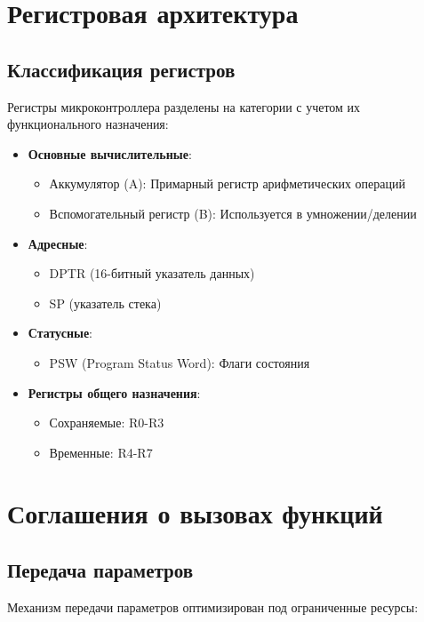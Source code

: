 \documentclass{article}
\begin{document}
\section{Регистровая архитектура}
\subsection{Классификация регистров}
Регистры микроконтроллера разделены на категории с учетом их функционального назначения:

\begin{itemize}
    \item \textbf{Основные вычислительные}:
        \begin{itemize}
            \item Аккумулятор (A): Примарный регистр арифметических операций
            \item Вспомогательный регистр (B): Используется в умножении/делении
        \end{itemize}
    
    \item \textbf{Адресные}:
        \begin{itemize}
            \item DPTR (16-битный указатель данных)
            \item SP (указатель стека)
        \end{itemize}
    
    \item \textbf{Статусные}:
        \begin{itemize}
            \item PSW (Program Status Word): Флаги состояния
        \end{itemize}
    
    \item \textbf{Регистры общего назначения}:
        \begin{itemize}
            \item Сохраняемые: R0-R3
            \item Временные: R4-R7
        \end{itemize}
\end{itemize}

\section{Соглашения о вызовах функций}
\subsection{Передача параметров}
Механизм передачи параметров оптимизирован под ограниченные ресурсы:
\end{document}
